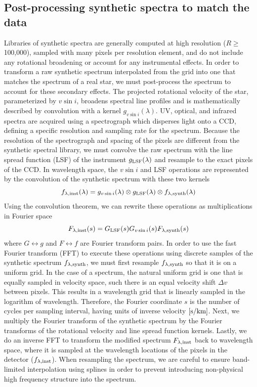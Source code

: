 \documentclass[iop,floatfix]{emulateapj}
\newcommand{\finst}{f_{\lambda, {\rm inst}}}
\newcommand{\fsynth}{f_{\lambda, {\rm synth}}}
\begin{document}
\subsection{Post-processing synthetic spectra to match the data}
Libraries of synthetic spectra are generally computed at high resolution ($R
 \geq $100,000), sampled with many pixels per resolution element, and do not
 include any rotational broadening or account for any instrumental effects. 
In order to transform a raw synthetic spectrum interpolated from the grid into
 one that matches the spectrum of a real star, we must post-process the spectrum
 to account for these secondary effects. 
The projected rotational velocity of the star, parameterized by $v \sin i$,
 broadens spectral line profiles and is mathematically described by convolution
 with a kernel $g_{v \sin i}(\lambda)$.  
UV, optical, and infrared spectra are acquired using a spectrograph which
 disperses light onto a CCD, defining a specific resolution and sampling rate
 for the spectrum. 
Because the resolution of the spectrograph and spacing of the pixels are
 different from the synthetic spectral library, we must convolve the raw
 spectrum with the line spread function (LSF) of the instrument $g_{\rm
 LSF}(\lambda)$ and resample to the exact pixels of the CCD. In wavelength
 space, the $v \sin i$ and LSF operations are represented by the convolution of
 the synthetic spectrum with these two kernels
\begin{equation}
  \finst(\lambda) = g_{v \sin i}(\lambda) \otimes g_{\rm LSF}(\lambda) \otimes \fsynth(\lambda)
  \label{eqn:convolution}
\end{equation}
Using the convolution theorem, we can rewrite these operations as
 multiplications in Fourier space 
\begin{equation}
  F_{\lambda, {\rm inst}}(s) = G_{\rm LSF}(s) G_{v \sin i}(s) F_{\lambda, {\rm synth}}(s)
\end{equation}
 where $G \leftrightarrow g$ and $F \leftrightarrow f$ are Fourier transform
 pairs. 
In order to use the fast Fourier transform (FFT) to execute these
 operations using discrete samples of the synthetic spectrum $\fsynth$, we must
 first resample $\fsynth$ so that it is on a uniform grid. 
In the case of a spectrum, the natural uniform grid is one that is equally
 sampled in velocity space, such there is an equal velocity shift $\Delta v$
 between pixels. This results in a wavelength grid that is linearly sampled in
 the logarithm of wavelength. 
Therefore, the Fourier coordinate $s$ is the number of cycles per sampling
 interval, having units of inverse velocity $[{\rm s}/{\rm km}]$. 
Next, we multiply the Fourier transform of the synthetic spectrum by the
 Fourier transforms of the rotational velocity and line spread function kernels.
Lastly, we do an inverse FFT to transform the modified spectrum $F_{\lambda,
 {\rm inst}}$ back to wavelength space, where it is sampled at the wavelength
 locations of the pixels in the detector ($\finst$). 
When resampling the spectrum, we are careful to ensure band-limited
 interpolation using splines in order to prevent introducing non-physical high
 frequency structure into the spectrum.
\end{document}
